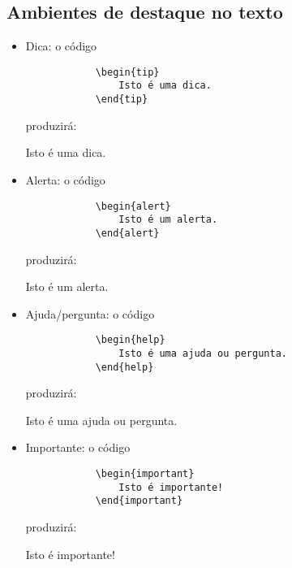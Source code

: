 

\newcommand{\com}[1]{\textbf{\backslash#1}}
\newcommand{\comp}[2]{\textbf{\backslash#1\{#2\}}}
\newcommand{\compp}[3]{\textbf{\backslash#1\{#2\}\{#3\}}}
\newcommand{\comop}[3]{\textbf{\backslash#1[#2]\{#3\}}}

\subsection{Ambientes de destaque no texto}

\begin{itemize}
    \item Dica: o código
        \begin{verbatim}
            \begin{tip}
                Isto é uma dica.
            \end{tip}\end{verbatim}
        produzirá:
        \begin{tip}
            Isto é uma dica.
        \end{tip}
        
    \item Alerta: o código
        \begin{verbatim}
            \begin{alert}
                Isto é um alerta.
            \end{alert}\end{verbatim}
        produzirá:
        \begin{alert}
            Isto é um alerta.
        \end{alert}
        
    \item Ajuda/pergunta: o código
        \begin{verbatim}
            \begin{help}
                Isto é uma ajuda ou pergunta.
            \end{help}\end{verbatim}
        produzirá:
        \begin{help}
            Isto é uma ajuda ou pergunta.
        \end{help}
        
    \item Importante: o código
        \begin{verbatim}
            \begin{important}
                Isto é importante!
            \end{important}\end{verbatim}
        produzirá:
        \begin{important}
            Isto é importante!
        \end{important}
    

\end{itemize}
